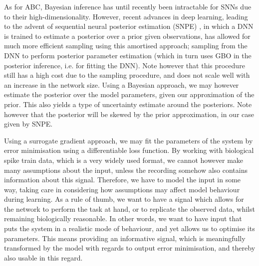\documentclass[mphil,deptreport,ianc]{infthesis} %
\begin{document}
As for ABC, Bayesian inference has until recently been intractable for SNNs due to their high-dimensionality. However, recent advances in deep learning, leading to the advent of sequential neural posterior estimation (SNPE) \cite{Greenberg2019a, Durkan2018, Goncalves2019, Cranmer2020a}, in which a DNN is trained to estimate a posterior over a prior given observations, has allowed for much more efficient sampling using this amortised approach; sampling from the DNN to perform posterior parameter estimation (which in turn uses GBO in the posterior inference, i.e. for fitting the DNN).
Note however that this procedure still has a high cost due to the sampling procedure, and does not scale well with an increase in the network size.
Using a Bayesian approach, we may however estimate the posterior over the model parameters, given our approximation of the prior. This also yields a type of uncertainty estimate around the posteriors. Note however that the posterior will be skewed by the prior approximation, in our case given by SNPE.
 
Using a surrogate gradient approach, we may fit the parameters of the system by error minimisation using a differentiable loss function. 
By working with biological spike train data, which is a very widely used format, we cannot however make many assumptions about the input, unless the recording somehow also contains information about this signal. 
Therefore, we have to model the input in some way, taking care in considering how assumptions may affect model behaviour during learning. 
As a rule of thumb, we want to have a signal which allows for the network to perform the task at hand, or to replicate the observed data, whilst remaining biologically reasonable.
In other words, we want to have input that puts the system in a realistic mode of behaviour, and yet allows us to optimise its parameters.
This means providing an informative signal, which is meaningfully transformed by the model with regards to output error minimisation, and thereby also usable in this regard.
\end{document}
